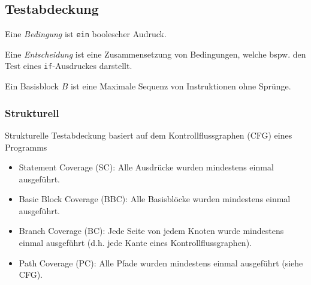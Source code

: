 \documentclass[ngerman,color=3b]{tuda_summary}
\begin{document}
\subsection{Testabdeckung}
\begin{definition}[Bedingung]
    Eine \textit{Bedingung} ist \texttt{ein} boolescher Audruck.
\end{definition}
\begin{definition}[Entscheidung]
    Eine \textit{Entscheidung} ist eine Zusammensetzung von Bedingungen, welche bspw. den Test eines \texttt{if}-Ausdruckes darstellt.
\end{definition}
\begin{definition}
    Ein Basisblock $B$ ist eine Maximale Sequenz von Instruktionen ohne Sprünge.
\end{definition}
\subsubsection{Strukturell}
Strukturelle Testabdeckung basiert auf dem Kontrollflussgraphen (CFG) eines Programms\begin{itemize}
    \item Statement Coverage (SC): Alle Ausdrücke wurden mindestens einmal ausgeführt.
    \item Basic Block Coverage (BBC): Alle Basisblöcke wurden mindestens einmal ausgeführt.
    \item Branch Coverage (BC): Jede Seite von jedem Knoten wurde mindestens einmal ausgeführt (d.h. jede Kante eines Kontrollflussgraphen).
    \item Path Coverage (PC): Alle Pfade wurden mindestens einmal ausgeführt (siehe CFG).
\end{itemize}
\end{document}

